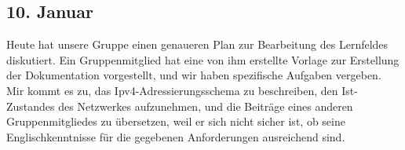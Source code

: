 \subsection{10. Januar}
Heute hat unsere Gruppe einen genaueren Plan zur Bearbeitung des Lernfeldes diskutiert. Ein Gruppenmitglied hat eine von ihm erstellte Vorlage zur Erstellung der Dokumentation vorgestellt, und wir haben spezifische Aufgaben vergeben. Mir kommt es zu, das Ipv4-Adressierungsschema zu beschreiben, den Ist-Zustandes des Netzwerkes aufzunehmen, und die Beiträge eines anderen Gruppenmitgliedes zu übersetzen, weil er sich nicht sicher ist, ob seine Englischkenntnisse für die gegebenen Anforderungen ausreichend sind.
